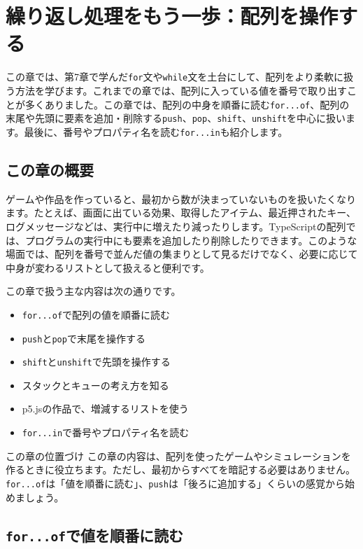 \chapter{繰り返し処理をもう一歩：配列を操作する}
\label{chap:iteration-again}

この章では、第7章で学んだ\texttt{for}文や\texttt{while}文を土台にして、配列をより柔軟に扱う方法を学びます。これまでの章では、配列に入っている値を番号で取り出すことが多くありました。この章では、配列の中身を順番に読む\texttt{for...of}、配列の末尾や先頭に要素を追加・削除する\texttt{push}、\texttt{pop}、\texttt{shift}、\texttt{unshift}を中心に扱います。最後に、番号やプロパティ名を読む\texttt{for...in}も紹介します。

\section{この章の概要}

ゲームや作品を作っていると、最初から数が決まっていないものを扱いたくなります。たとえば、画面に出ている効果、取得したアイテム、最近押されたキー、ログメッセージなどは、実行中に増えたり減ったりします。TypeScriptの配列では、プログラムの実行中にも要素を追加したり削除したりできます。このような場面では、配列を番号で並んだ値の集まりとして見るだけでなく、必要に応じて中身が変わるリストとして扱えると便利です。

この章で扱う主な内容は次の通りです。

\begin{itemize}
    \item \texttt{for...of}で配列の値を順番に読む
    \item \texttt{push}と\texttt{pop}で末尾を操作する
    \item \texttt{shift}と\texttt{unshift}で先頭を操作する
    \item スタックとキューの考え方を知る
    \item p5.jsの作品で、増減するリストを使う
    \item \texttt{for...in}で番号やプロパティ名を読む
\end{itemize}

\begin{pointbox}{この章の位置づけ}
この章の内容は、配列を使ったゲームやシミュレーションを作るときに役立ちます。ただし、最初からすべてを暗記する必要はありません。\texttt{for...of}は「値を順番に読む」、\texttt{push}は「後ろに追加する」くらいの感覚から始めましょう。
\end{pointbox}

\section{\texttt{for...of}で値を順番に読む}


